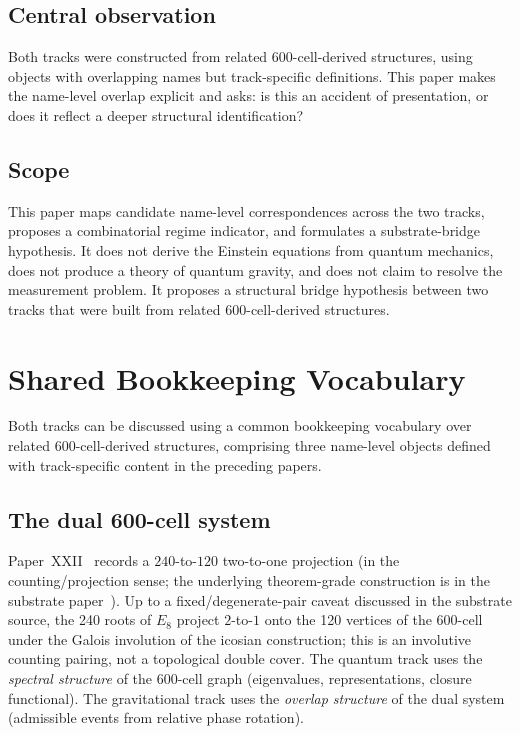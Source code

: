 \documentclass[12pt]{article}
\begin{document}
\subsection*{Central observation}

Both tracks were constructed from related 600-cell-derived structures, using objects with overlapping names but track-specific definitions. This paper makes the name-level overlap explicit and asks: is this an accident of presentation, or does it reflect a deeper structural identification?

\subsection*{Scope}

This paper maps candidate name-level correspondences across the two tracks, proposes a combinatorial regime indicator, and formulates a substrate-bridge hypothesis. It does not derive the Einstein equations from quantum mechanics, does not produce a theory of quantum gravity, and does not claim to resolve the measurement problem. It proposes a structural bridge hypothesis between two tracks that were built from related 600-cell-derived structures.

\section{Shared Bookkeeping Vocabulary}\label{sec:substrate}

Both tracks can be discussed using a common bookkeeping vocabulary over related 600-cell-derived structures, comprising three name-level objects defined with track-specific content in the preceding papers.

\subsection{The dual 600-cell system}

Paper~XXII~\citep{SmartXXII} records a $240$-to-$120$ two-to-one projection (in the counting/projection sense; the underlying theorem-grade construction is in the substrate paper~\citep{CascadeAlgebraicSubstrate}). Up to a fixed/degenerate-pair caveat discussed in the substrate source, the 240 roots of $E_8$ project $2$-to-$1$ onto the 120 vertices of the 600-cell under the Galois involution of the icosian construction; this is an involutive counting pairing, not a topological double cover. The quantum track uses the \textit{spectral structure} of the 600-cell graph (eigenvalues, representations, closure functional). The gravitational track uses the \textit{overlap structure} of the dual system (admissible events from relative phase rotation).
\end{document}
